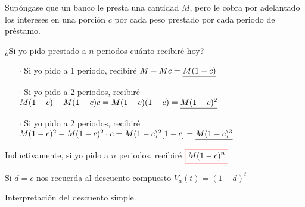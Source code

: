 Supóngase que un banco le presta una cantidad $M$, pero le cobra por adelantado los intereses en una porción $c$ por cada peso prestado por cada periodo de préstamo.

¿Si yo pido prestado a $n$ periodos cuánto recibiré hoy?
\begin{itemize}
\item[$\cdot$] Si yo pido a 1 periodo, recibiré $M-Mc = \uline{M(1-c)}$
\item[$\cdot$] Si yo pido a 2 periodos, recibiré $M(1-c) - M(1-c)c = M(1-c)(1-c) = \uline{M(1-c)^2}$
\item[$\cdot$] Si yo pido a 2 periodos, recibiré $M(1-c)^2 - M(1-c)^2 \cdot c = M(1-c)^2[1-c] = \uline{M(1-c)^3}$
\end{itemize}
Inductivamente, si yo pido a $n$ periodos, recibiré $\color{red}\boxed{\color{black}M(1-c)^n}$

Si $d=c$ nos recuerda al descuento compuesto $V_a(t) = (1-d)^t$ 

\color{red} Interpretación del descuento simple.\color{black}

